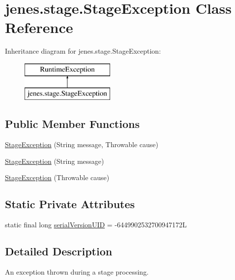 \hypertarget{classjenes_1_1stage_1_1_stage_exception}{\section{jenes.\-stage.\-Stage\-Exception Class Reference}
\label{classjenes_1_1stage_1_1_stage_exception}
}
Inheritance diagram for jenes.\-stage.\-Stage\-Exception\-:\begin{figure}[H]
\begin{center}
\leavevmode
\includegraphics[height=2.000000cm]{classjenes_1_1stage_1_1_stage_exception}
\end{center}
\end{figure}
\subsection*{Public Member Functions}
\begin{DoxyCompactItemize}
\item 
\hyperlink{classjenes_1_1stage_1_1_stage_exception_a4d0eb751151a2693b452176fd2fae090}{Stage\-Exception} (String message, Throwable cause)
\item 
\hyperlink{classjenes_1_1stage_1_1_stage_exception_aff6f4c1b58696d6e0aae42eaa78c3506}{Stage\-Exception} (String message)
\item 
\hyperlink{classjenes_1_1stage_1_1_stage_exception_ab95390b5a08e2fe49d3f354204390710}{Stage\-Exception} (Throwable cause)
\end{DoxyCompactItemize}
\subsection*{Static Private Attributes}
\begin{DoxyCompactItemize}
\item 
static final long \hyperlink{classjenes_1_1stage_1_1_stage_exception_addd1ac5c7a5798d72c41403d9fd51aac}{serial\-Version\-U\-I\-D} = -\/6449902532700947172\-L
\end{DoxyCompactItemize}


\subsection{Detailed Description}
An exception thrown during a stage processing. 

